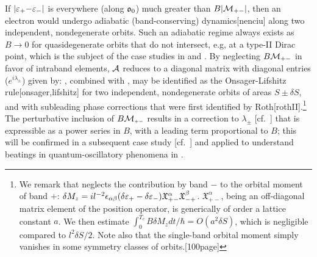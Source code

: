 \documentclass[aps, prb, showpacs, twocolumn, notitlepage, superscriptaddress]{revtex4-1}
\begin{document}
 If $|\varepsilon_+{-}\varepsilon_-|$ is everywhere (along $\mathfrak{o}_0$) much greater than $B|{\cal M}_{+-}|$, then an electron would undergo adiabatic (band-conserving) dynamics[nenciu] along two independent, nondegenerate orbits. Such an adiabatic regime always exists as $B{\rightarrow} 0$ for quasidegenerate orbits that do not intersect, e.g, at a type-II Dirac point, which is the subject of the case studies in  and .
By  neglecting  $B{\cal M}_{+-}$ in favor of intraband elements,  ${\cal A}$ reduces to a diagonal matrix with  diagonal entries ($e^{i\lambda_{\pm}}$) given by:
, combined with , may be identified as the Onsager-Lifshitz rule[onsager,lifshitz] for  two independent, nondegenerate orbits of areas $S{\pm}\delta S$, and with subleading phase corrections that were first identified by Roth[rothII].\footnote{We remark that  neglects the contribution by band $-$ to the orbital moment of band $+$: $\delta M_z=il^{-2}\epsilon_{\alpha\beta}(\delta \varepsilon_+-\delta \varepsilon_-)\mathfrak{X}^{\alpha}_{+-}\mathfrak{X}^{\beta}_{-+}$. $\mathfrak{X}^{\alpha}_{+-}$, being an off-diagonal matrix element of the position operator, is generically of order a lattice constant $a$. We then estimate $\int_0^{T_c} B\delta M_z dt/\hbar=O(a^2 \delta S )$, which is negligible compared to $l^2\delta S/2$. Note also that the single-band orbital moment simply vanishes in some symmetry classes of orbits.[100page] } The perturbative inclusion of $B{\cal M}_{\scriptscriptstyle{+-}}$ results in  a correction to $\lambda_{\pm}$ [cf.\ ] that is expressible as a power series in $B$, with a leading term proportional to $B$; this will be confirmed in a subsequent case study [cf.\ ] and applied to understand beatings in quantum-oscillatory phenomena in  .    \\





\end{document}
